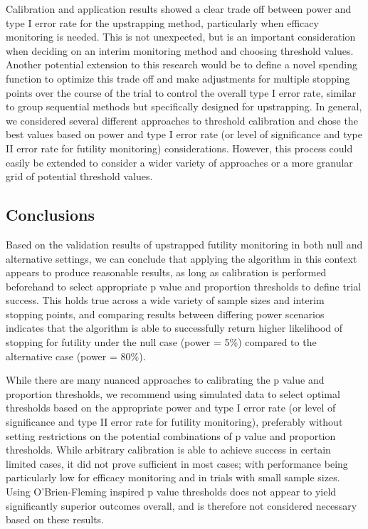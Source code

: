 \documentclass[Afour,sageh,times,square,numbers]{sagej}
\begin{document}
Calibration and application results showed a clear trade off between power and type I error rate for the upstrapping method, particularly when efficacy monitoring is needed.  This is not unexpected, but is an important consideration when deciding on an interim monitoring method and choosing threshold values.  Another potential extension to this research would be to define a novel spending function to optimize this trade off and make adjustments for multiple stopping points over the course of the trial to control the overall type I error rate, similar to group sequential methods but specifically designed for upstrapping.  In general, we considered several different approaches to threshold calibration and chose the best values based on power and type I error rate (or level of significance and type II error rate for futility monitoring) considerations.  However, this process could easily be extended to consider a wider variety of approaches or a more granular grid of potential threshold values.

\subsection{Conclusions}

Based on the validation results of upstrapped futility monitoring in both null and alternative settings, we can conclude that applying the algorithm in this context appears to produce reasonable results, as long as calibration is performed beforehand to select appropriate p value and proportion thresholds to define trial success.  This holds true across a wide variety of sample sizes and interim stopping points, and comparing results between differing power scenarios indicates that the algorithm is able to successfully return higher likelihood of stopping for futility under the null case (power = 5\%) compared to the alternative case (power = 80\%).

While there are many nuanced approaches to calibrating the p value and proportion thresholds, we recommend using simulated data to select optimal thresholds based on the appropriate power and type I error rate (or level of significance and type II error rate for futility monitoring), preferably without setting restrictions on the potential combinations of p value and proportion thresholds.  While arbitrary calibration is able to achieve success in certain limited cases, it did not prove sufficient in most cases; with performance being particularly low for efficacy monitoring and in trials with small sample sizes.  Using O’Brien-Fleming inspired p value thresholds does not appear to yield significantly superior outcomes overall, and is therefore not considered necessary based on these results.
\end{document}
